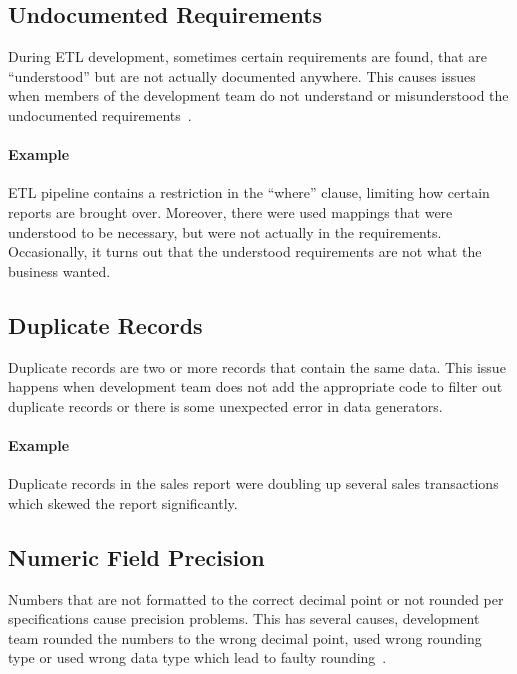 \subsection*{Undocumented Requirements}

During ETL development, sometimes certain requirements are found, that are \enquote{understood} but are not actually documented anywhere.
This causes issues when members of the development team do not understand or misunderstood the undocumented requirements~\cite{web:common-defects}.

\paragraph*{Example} ETL pipeline contains a restriction in the \enquote{where} clause, limiting how certain reports are brought over.
Moreover, there were used mappings that were understood to be necessary, but were not actually in the requirements.
Occasionally, it turns out that the understood requirements are not what the business wanted.

\subsection*{Duplicate Records}

Duplicate records are two or more records that contain the same data.
This issue happens when development team does not add the appropriate code to filter out duplicate records or there is some unexpected error in data generators.

\paragraph*{Example} Duplicate records in the sales report were doubling up several sales transactions which skewed the report significantly.


\subsection*{Numeric Field Precision}

Numbers that are not formatted to the correct decimal point or not rounded per specifications cause precision problems.
This has several causes, development team rounded the numbers to the wrong decimal point, used wrong rounding type or used wrong data type which lead to faulty rounding~\cite{web:common-defects}.

